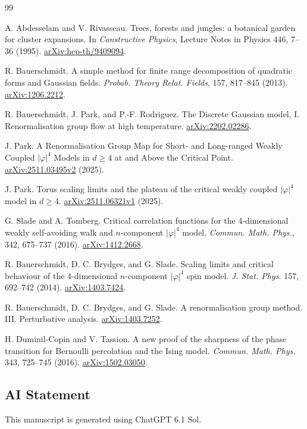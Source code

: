 \documentclass[11pt]{article}
\begin{document}
\begin{thebibliography}{99}

A. Abdesselam and V. Rivasseau.
\newblock Trees, forests and jungles: a botanical garden for cluster expansions.
\newblock In \emph{Constructive Physics}, Lecture Notes in Physics 446,
7--36 (1995).
\newblock \href{https://arxiv.org/abs/hep-th/9409094}{arXiv:hep-th/9409094}.


R. Bauerschmidt.
\newblock A simple method for finite range decomposition of quadratic forms
and Gaussian fields.
\newblock \emph{Probab. Theory Relat. Fields}, 157, 817--845 (2013).
\newblock \href{https://arxiv.org/abs/1206.2212}{arXiv:1206.2212}.

R. Bauerschmidt, J. Park, and P.-F. Rodriguez.
\newblock The Discrete Gaussian model, I. Renormalisation group flow at high temperature.
\newblock \href{https://arxiv.org/abs/2202.02286}{arXiv:2202.02286}.

J. Park.
\newblock A Renormalisation Group Map for Short- and Long-ranged Weakly
Coupled \(\lvert\varphi\rvert^4\) Models in \(d\ge4\) at and Above the Critical Point.
\newblock \href{https://arxiv.org/html/2511.03495v2}{arXiv:2511.03495v2} (2025).

J. Park.
\newblock Torus scaling limits and the plateau of the critical weakly
coupled \(\lvert\varphi\rvert^4\) model in \(d\ge4\).
\newblock \href{https://arxiv.org/html/2511.06321v1}{arXiv:2511.06321v1} (2025).

G. Slade and A. Tomberg.
\newblock Critical correlation functions for the 4-dimensional weakly
self-avoiding walk and \(n\)-component \(\lvert\varphi\rvert^4\) model.
\newblock \emph{Commun. Math. Phys.}, 342, 675--737 (2016).
\newblock \href{https://arxiv.org/abs/1412.2668}{arXiv:1412.2668}.


R. Bauerschmidt, D. C. Brydges, and G. Slade.
\newblock Scaling limits and critical behaviour of the 4-dimensional
\(n\)-component \(\lvert\varphi\rvert^4\) spin model.
\newblock \emph{J. Stat. Phys.} 157, 692--742 (2014).
\newblock \href{https://arxiv.org/abs/1403.7424}{arXiv:1403.7424}.

R. Bauerschmidt, D. C. Brydges, and G. Slade.
\newblock A renormalisation group method. III. Perturbative analysis.
\newblock \href{https://arxiv.org/abs/1403.7252}{arXiv:1403.7252}.

H. Duminil-Copin and V. Tassion.
\newblock A new proof of the sharpness of the phase transition for
Bernoulli percolation and the Ising model.
\newblock \emph{Commun. Math. Phys.} 343, 725--745 (2016).
\newblock \href{https://arxiv.org/abs/1502.03050}{arXiv:1502.03050}.
\end{thebibliography}

\subsection*{AI Statement}

This manuscript is generated using ChatGPT 6.1 Sol.
\end{document}
